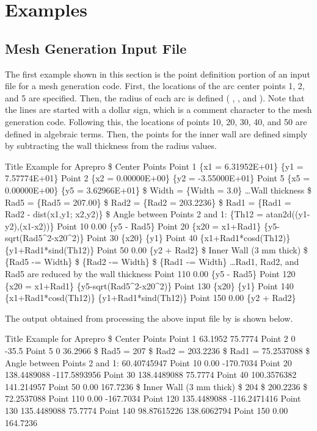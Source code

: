\chapter{Examples}\label{ch:examples}

\section{Mesh Generation Input File}

The first example shown in this section is the point definition portion of an input
file for a mesh generation code. First, the locations of the arc center points
1, 2, and 5 are specified. Then, the radius of each arc is defined ( ,
, and ). Note that the lines are started with a dollar sign, which
is a comment character to the mesh generation code. Following this, the locations
of points 10, 20, 30, 40, and 50 are defined in algebraic terms. Then, the points
for the inner wall are defined simply by subtracting the wall thickness from the
radius values.
\begin{apinp}
Title
Example for Aprepro
\$  Center  Points
Point  1  \{x1  =  6.31952E+01\}  \{y1  =  7.57774E+01\}
Point  2  \{x2  =  0.00000E+00\}  \{y2  =  -3.55000E+01\}
Point  5  \{x5  =  0.00000E+00\}  \{y5  =  3.62966E+01\}
\$  Width  =  \{Width  =  3.0\}
\ldots Wall thickness
\$  Rad5  =  \{Rad5  =  207.00\}
\$  Rad2  =  \{Rad2  =  203.2236\}
\$  Rad1  =  \{Rad1  =  Rad2  -  dist(x1,y1;  x2,y2)\}
\$  Angle  between  Points  2  and  1:  \{Th12  =  atan2d((y1-y2),(x1-x2))\}
Point  10  0.00    \{y5  -  Rad5\}
Point  20  \{x20  =  x1+Rad1\}    \{y5-sqrt(Rad5\^{}2-x20\^{}2)\}
Point  30  \{x20\}    \{y1\}
Point  40  \{x1+Rad1*cosd(Th12)\}  \{y1+Rad1*sind(Th12)\}
Point  50  0.00    \{y2  +  Rad2\}
\$  Inner Wall (3  mm  thick)
\$  \{Rad5  -=  Width\}
\$  \{Rad2  -=  Width\}
\$  \{Rad1  -=  Width\}
\ldots Rad1, Rad2, and Rad5 are reduced by the wall thickness
Point  110  0.00    \{y5  -  Rad5\}
Point  120  \{x20  =  x1+Rad1\}    \{y5-sqrt(Rad5\^{}2-x20\^{}2)\}
Point  130  \{x20\}    \{y1\}
Point  140  \{x1+Rad1*cosd(Th12)\}  \{y1+Rad1*sind(Th12)\}
Point  150  0.00    \{y2  +  Rad2\}
\end{apinp}
The output obtained from processing the above input file by \aprepro{} is shown below.
\begin{apout}
Title
Example for  Aprepro
\$  Center  Points
Point  1  63.1952  75.7774
Point  2  0  -35.5
Point  5  0  36.2966
\$  Rad5  =  207
\$  Rad2  =  203.2236
\$  Rad1  =  75.2537088
\$  Angle between  Points  2  and  1:  60.40745947
Point  10  0.00  -170.7034
Point  20  138.4489088  -117.5893956
Point  30  138.4489088  75.7774
Point  40  100.3576382  141.214957
Point  50  0.00  167.7236
\$  Inner Wall  (3  mm  thick)
\$  204
\$  200.2236
\$  72.2537088
Point  110  0.00  -167.7034
Point  120  135.4489088  -116.2471416
Point  130  135.4489088  75.7774
Point  140  98.87615226  138.6062794
Point  150  0.00  164.7236
\end{apout}


